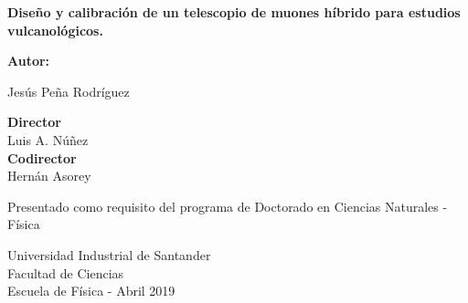 \documentclass[a4paper,12pt,twoside]{report}
\title{}
\begin{document}
\begin{center}
\thispagestyle{empty}
\fontsize{12pt}{12pt}\selectfont 



\textbf {\huge Diseño y calibración de un telescopio de muones híbrido para estudios vulcanológicos.}


\vspace{3cm}

{\large \textbf{Autor:}}

\vspace{0.5cm}

\large Jesús Peña Rodríguez

\vspace{3cm}
{\large \textbf{Director}}\\
\vspace{0.5cm}
{\large Luis A. Núñez}\\
\vspace{0.5cm}
{\large \textbf{Codirector}}\\
\vspace{0.5cm}
{\large Hernán Asorey}
\vspace{3cm}


\normalsize
\large Presentado como requisito del programa de 
\linebreak
\large Doctorado en Ciencias Naturales - Física

\vspace{4cm}

\large Universidad Industrial de Santander\\

\large  Facultad de Ciencias \\

\large  Escuela de Física - Abril 2019
    
  \end{center}
\large


\newpage

\tableofcontents %

\cleardoublepage
{} %
\listoffigures %








%



%
%

\newpage
\cleardoublepage
{}%


\end{document}
